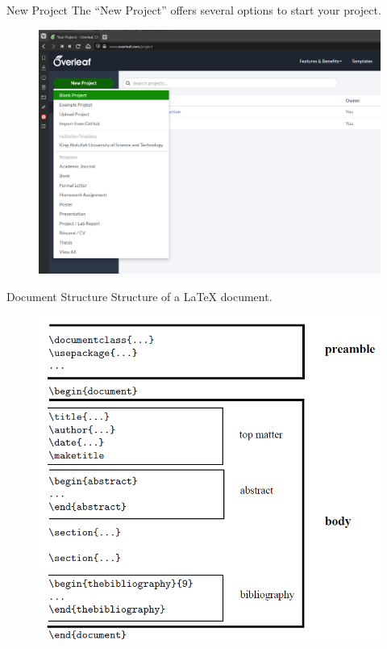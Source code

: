 \documentclass[aspectratio=169]{beamer}
\begin{document}
\begin{frame}{New Project}
    The ``New Project'' offers several options to start your project.
    \begin{figure}
        \centering
        \includegraphics[scale=0.25]{images/overleaf_new_project.png}
        \label{fig:new_project}
    \end{figure}
\end{frame}

\begin{frame}{Document Structure}
    Structure of a \LaTeX{} document. 
    \begin{figure}
        \centering
        \includegraphics[scale=0.4]{images/latex_structure.png}
        \label{fig:latexStruct}
    \end{figure}
\end{frame}
\end{document}
